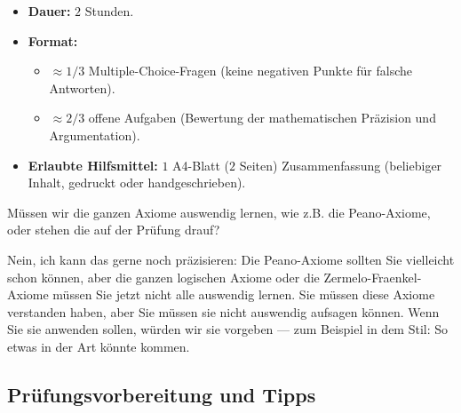 \begin{math-stroke}
\begin{itemize}
    \item \textbf{Dauer:} $2$ Stunden.
    \item \textbf{Format:}
    \begin{itemize}
        \item \textbf{$\approx 1/3$} Multiple-Choice-Fragen (keine negativen Punkte für falsche Antworten).
        \item \textbf{$\approx 2/3$} offene Aufgaben (Bewertung der mathematischen Präzision und Argumentation).
    \end{itemize}
    \item \textbf{Erlaubte Hilfsmittel:} \textbf{$1$} A4-Blatt ($2$ Seiten) Zusammenfassung (beliebiger Inhalt, gedruckt oder handgeschrieben).
\end{itemize}
\end{math-stroke}

\begin{student-interaction}[Studentenfrage]
Müssen wir die ganzen Axiome auswendig lernen, wie z.B. die Peano-Axiome, oder stehen die auf der Prüfung drauf?
\end{student-interaction}

\begin{spoken-clean}[01:23:49 - 01:24:19]
Nein, ich kann das gerne noch präzisieren: Die Peano-Axiome sollten Sie vielleicht schon können, aber die ganzen logischen Axiome oder die Zermelo-Fraenkel-Axiome müssen Sie jetzt nicht alle auswendig lernen. Sie müssen diese Axiome verstanden haben, aber Sie müssen sie nicht auswendig aufsagen können. Wenn Sie sie anwenden sollen, würden wir sie vorgeben --- zum Beispiel in dem Stil:  So etwas in der Art könnte kommen.
\end{spoken-clean}

\subsection{Prüfungsvorbereitung und Tipps}

